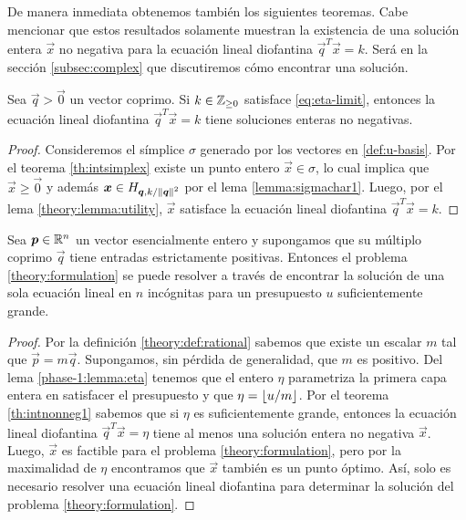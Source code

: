 De manera inmediata obtenemos también los siguientes teoremas. Cabe mencionar que estos resultados
solamente muestran la existencia de una solución entera $\vec{x}$ no negativa para la ecuación lineal
diofantina $\vec{q}^T\vec{x} = k$. Será en la sección \ref{subsec:complex} que discutiremos cómo
encontrar una solución.
\begin{theorem}
	\label{th:intnonneg1}
	Sea $\vec{q} > \vec{0}$ un vector coprimo. Si $k \in \mathbb{Z}_{\geq 0}$ satisface \eqref{eq:eta-limit},
	entonces la ecuación lineal diofantina $\vec{q}^T\vec{x} = k$ tiene soluciones enteras no
	negativas.
\end{theorem}
\begin{proof}
	Consideremos el símplice $\sigma$ generado por los vectores en \eqref{def:u-basis}. Por el
	teorema \ref{th:intsimplex} existe un punto entero $\vec{x} \in \sigma$, lo cual implica que
	$\vec{x} \geq \vec{0}$ y además $\boldsymbol{x} \in H_{\boldsymbol{\boldsymbol{q}}, k/\left\lVert \boldsymbol{\boldsymbol{q}} \right\rVert^{2}}$ por el lema
	\ref{lemma:sigmachar1}. Luego, por el lema \ref{theory:lemma:utility}, $\vec{x}$ satisface la
	ecuación lineal diofantina $\vec{q}^T\vec{x} = k$.
\end{proof}
\begin{theorem}
	\label{th:intnonneg2}
	Sea $\boldsymbol{p} \in \mathbb{R}^n$ un vector esencialmente entero y supongamos que su múltiplo coprimo
	$\vec{q}$ tiene entradas estrictamente positivas. Entonces el problema
	\eqref{theory:formulation} se puede resolver a través de encontrar la solución de una sola
	ecuación lineal en $n$ incógnitas para un presupuesto $u$ suficientemente grande.
\end{theorem}
\begin{proof}
	Por la definición \ref{theory:def:rational} sabemos que existe un escalar $m$ tal que
	$\vec{p} = m\vec{q}$. Supongamos, sin pérdida de generalidad, que $m$ es positivo. Del lema
	\ref{phase-1:lemma:eta} tenemos que el entero $\eta$ parametriza la primera capa entera en
	satisfacer el presupuesto y que $\eta = \left\lfloor u/m \right\rfloor$. Por el teorema \ref{th:intnonneg1} sabemos
	que si $\eta$ es suficientemente grande, entonces la ecuación lineal diofantina
	$\vec{q}^T\vec{x} = \eta$ tiene al menos una solución entera no negativa $\vec{x}$. Luego,
	$\vec{x}$ es factible para el problema \eqref{theory:formulation}, pero por la maximalidad de
	$\eta$ encontramos que $\vec{x}$ también es un punto óptimo. Así, solo es
	necesario resolver una ecuación lineal diofantina para determinar la solución del problema
	\eqref{theory:formulation}.
\end{proof}

